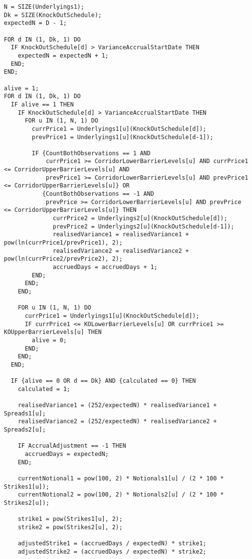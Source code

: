 \begin{listing}[hbt]
\begin{verbatim}
N = SIZE(Underlyings1);
Dk = SIZE(KnockOutSchedule);
expectedN = D - 1;

FOR d IN (1, Dk, 1) DO
  IF KnockOutSchedule[d] > VarianceAccrualStartDate THEN
    expectedN = expectedN + 1;
  END;
END;

alive = 1;
FOR d IN (1, Dk, 1) DO
  IF alive == 1 THEN
    IF KnockOutSchedule[d] > VarianceAccrualStartDate THEN
      FOR u IN (1, N, 1) DO
        currPrice1 = Underlyings1[u](KnockOutSchedule[d]);
        prevPrice1 = Underlyings1[u](KnockOutSchedule[d-1]);

        IF {CountBothObservations == 1 AND
            currPrice1 >= CorridorLowerBarrierLevels[u] AND currPrice1 <= CorridorUpperBarrierLevels[u] AND
            prevPrice1 >= CorridorLowerBarrierLevels[u] AND prevPrice1 <= CorridorUpperBarrierLevels[u]} OR
           {CountBothObservations == -1 AND
            prevPrice >= CorridorLowerBarrierLevels[u] AND prevPrice <= CorridorUpperBarrierLevels[u]} THEN
              currPrice2 = Underlyings2[u](KnockOutSchedule[d]);
              prevPrice2 = Underlyings2[u](KnockOutSchedule[d-1]);
              realisedVariance1 = realisedVariance1 + pow(ln(currPrice1/prevPrice1), 2);
              realisedVariance2 = realisedVariance2 + pow(ln(currPrice2/prevPrice2), 2);
              accruedDays = accruedDays + 1;
        END;
      END;
    END;

    FOR u IN (1, N, 1) DO
      currPrice1 = Underlyings1[u](KnockOutSchedule[d]);
      IF currPrice1 <= KOLowerBarrierLevels[u] OR currPrice1 >= KOUpperBarrierLevels[u] THEN
        alive = 0;
      END;
    END;
  END;

  IF {alive == 0 OR d == Dk} AND {calculated == 0} THEN
    calculated = 1;

    realisedVariance1 = (252/expectedN) * realisedVariance1 + Spreads1[u];
    realisedVariance2 = (252/expectedN) * realisedVariance2 + Spreads2[u];

    IF AccrualAdjustment == -1 THEN
      accruedDays = expectedN;
    END;

    currentNotional1 = pow(100, 2) * Notionals1[u] / (2 * 100 * Strikes1[u]);
    currentNotional2 = pow(100, 2) * Notionals2[u] / (2 * 100 * Strikes2[u]);

    strike1 = pow(Strikes1[u], 2);
    strike2 = pow(Strikes2[u], 2);

    adjustedStrike1 = (accruedDays / expectedN) * strike1;
    adjustedStrike2 = (accruedDays / expectedN) * strike2;


\end{verbatim}
\end{listing}
